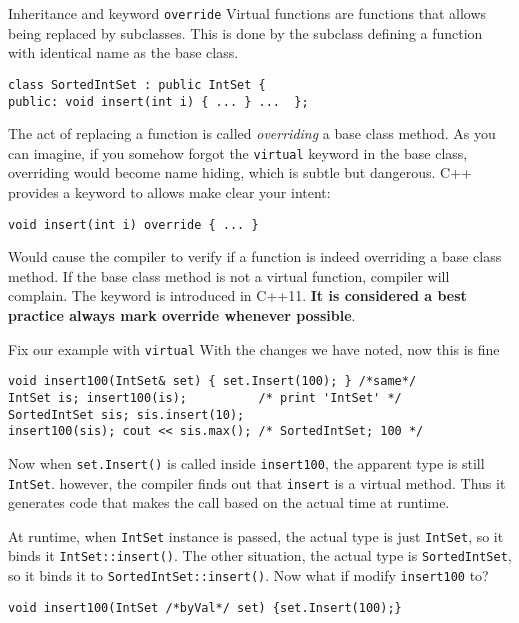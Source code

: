 \begin{frame}[fragile]{Inheritance and keyword \texttt{override}}
\vspace{-0.1in}
Virtual functions are functions that allows being replaced by subclasses. This is done by the subclass defining a function with identical name as the base class. 
\begin{verbatim}
class SortedIntSet : public IntSet {
public: void insert(int i) { ... } ...  };
\end{verbatim}
The act of replacing a function is called \textit{overriding} a base class method. As you can imagine, if you somehow forgot the \texttt{virtual} keyword in the base class, overriding would become name hiding, which is subtle but dangerous. C++ provides a keyword to allows make clear your intent:
\begin{verbatim}
void insert(int i) override { ... }
\end{verbatim}
Would cause the compiler to verify if a function is indeed overriding a base class method. If the base class method is not a virtual function, compiler will complain. The keyword is introduced in C++11. \textbf{It is considered a best practice always mark override whenever possible}.
\end{frame}

\begin{frame}[fragile]{Fix our example with \texttt{virtual}}
With the changes we have noted, now this is fine
\begin{verbatim}
void insert100(IntSet& set) { set.Insert(100); } /*same*/
IntSet is; insert100(is);          /* print 'IntSet' */
SortedIntSet sis; sis.insert(10);
insert100(sis); cout << sis.max(); /* SortedIntSet; 100 */
\end{verbatim}

Now when \texttt{set.Insert()} is called inside \texttt{insert100}, the apparent type is still \texttt{IntSet}. however, the compiler finds out that \texttt{insert} is a virtual method. Thus it generates code that makes the call based on the actual time at runtime.

At runtime, when \texttt{IntSet} instance is passed, the actual type is just \texttt{IntSet}, so it binds it \texttt{IntSet::insert()}. The other situation, the actual type is  \texttt{SortedIntSet}, so it binds it to \texttt{SortedIntSet::insert()}. Now what if modify \texttt{insert100} to?
\begin{verbatim}
void insert100(IntSet /*byVal*/ set) {set.Insert(100);}
\end{verbatim}
\end{frame}

